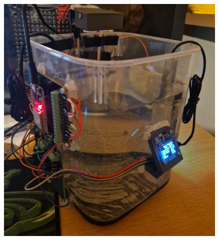 \documentclass[11pt,a4paper]{article}
\begin{document}
\begin{figure}[h!]
    \centering
    \begin{minipage}{0.35\textwidth}
        \centering
        \includegraphics[width=\linewidth]{Images/frenteProt.jpeg}
    \end{minipage}
    \hfill
    \begin{minipage}{0.33\textwidth}
        \centering

\end{minipage}
\end{figure}
\end{document}

